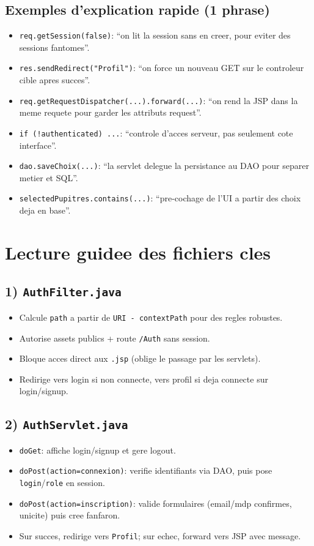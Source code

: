 ﻿\documentclass[11pt,a4paper]{article}
\begin{document}
\subsection*{Exemples d'explication rapide (1 phrase)}
\begin{itemize}
  \item \texttt{req.getSession(false)}: ``on lit la session sans en creer, pour eviter des sessions fantomes''.
  \item \texttt{res.sendRedirect("Profil")}: ``on force un nouveau GET sur le controleur cible apres succes''.
  \item \texttt{req.getRequestDispatcher(...).forward(...)}: ``on rend la JSP dans la meme requete pour garder les attributs request''.
  \item \texttt{if (!authenticated) ...}: ``controle d'acces serveur, pas seulement cote interface''.
  \item \texttt{dao.saveChoix(...)}: ``la servlet delegue la persistance au DAO pour separer metier et SQL''.
  \item \texttt{selectedPupitres.contains(...)}: ``pre-cochage de l'UI a partir des choix deja en base''.
\end{itemize}

\section{Lecture guidee des fichiers cles}
\subsection*{1) \texttt{AuthFilter.java}}
\begin{itemize}
  \item Calcule \texttt{path} a partir de \texttt{URI - contextPath} pour des regles robustes.
  \item Autorise assets publics + route \texttt{/Auth} sans session.
  \item Bloque acces direct aux \texttt{.jsp} (oblige le passage par les servlets).
  \item Redirige vers login si non connecte, vers profil si deja connecte sur login/signup.
\end{itemize}

\subsection*{2) \texttt{AuthServlet.java}}
\begin{itemize}
  \item \texttt{doGet}: affiche login/signup et gere logout.
  \item \texttt{doPost(action=connexion)}: verifie identifiants via DAO, puis pose \texttt{login}/\texttt{role} en session.
  \item \texttt{doPost(action=inscription)}: valide formulaires (email/mdp confirmes, unicite) puis cree fanfaron.
  \item Sur succes, redirige vers \texttt{Profil}; sur echec, forward vers JSP avec message.
\end{itemize}
\end{document}

